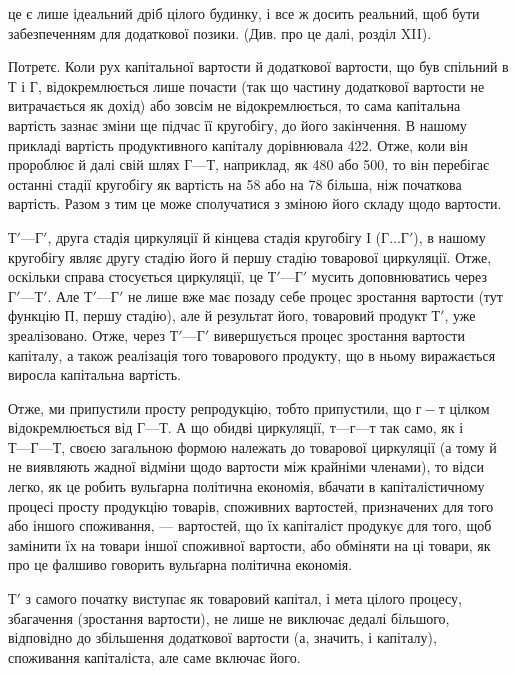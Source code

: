 \parcont{}  %
це є лише ідеальний дріб цілого будинку, і все ж досить реальний, щоб
бути забезпеченням для додаткової позики. (Див. про це далі, розділ XII).

Потретє. Коли рух капітальної вартости й додаткової вартости, що
був спільний в $Т$ і $Г$, відокремлюється лише почасти (так що частину
додаткової вартости не витрачається як дохід) або зовсім не відокремлюється,
то сама капітальна вартість зазнає зміни ще підчас її кругобігу,
до його закінчення. В нашому прикладі вартість продуктивного капіталу
дорівнювала 422. Отже, коли він пророблює й далі свій шлях
$Г — Т$, наприклад, як 480 або 500, то він перебігає
останні стадії кругобігу як вартість на 58 або на 78
більша, ніж початкова вартість. Разом з тим це може сполучатися з зміною
його складу щодо вартости.

$Т' — Г'$, друга стадія циркуляції й кінцева стадія кругобігу І ($ Г\dots{} Г'$),
в нашому кругобігу являє другу стадію його й першу стадію товарової
циркуляції. Отже, оскільки справа стосується циркуляції, це $Т' — Г'$ мусить
доповнюватись через $Г' — Т'$. Але $Т' — Г'$ не лише вже має позаду себе процес
зростання вартости (тут функцію $П$, першу стадію), але й результат його,
товаровий продукт $Т'$, уже зреалізовано. Отже, через $Т' — Г'$ вивершується
процес зростання вартости капіталу, а також реалізація того товарового продукту,
що в ньому виражається виросла капітальна вартість.

Отже, ми припустили просту репродукцію, тобто припустили, що
$г-т$ цілком відокремлюється від $Г — Т$. А що обидві циркуляції,
$т — г — т$ так само, як і $Т — Г — Т$, своєю загальною формою належать
до товарової циркуляції (а тому й не виявляють жадної відміни щодо
вартости між крайніми членами), то відси легко, як це робить вульґарна
політична економія, вбачати в капіталістичному процесі просту
продукцію товарів, споживних вартостей, призначених для того або іншого
споживання, — вартостей, що їх капіталіст продукує для того, щоб замінити
їх на товари іншої споживної вартости, або обміняти на ці товари, як
про це фалшиво говорить вульґарна політична економія.

$Т'$ з самого початку виступає як товаровий капітал, і мета цілого
процесу, збагачення (зростання вартости), не лише не виключає дедалі
більшого, відповідно до збільшення додаткової вартости (а, значить, і
капіталу), споживання капіталіста, але саме включає його.

